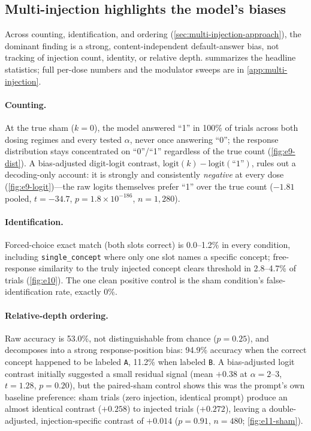 \subsection{Multi-injection highlights the model's biases}

\label{sec:multi-injection-results}

Across counting, identification, and ordering (\cref{sec:multi-injection-approach}), the dominant finding is a strong, content-independent default-answer bias, not tracking of injection count, identity, or relative depth.
 summarizes the headline statistics; full per-dose numbers and the modulator sweeps are in \cref{app:multi-injection}.

\paragraph{Counting.}
At the true sham ($k{=}0$), the model answered ``1'' in 100\% of trials across both dosing regimes and every tested $\alpha$, never once answering ``0''; the response distribution stays concentrated on ``0''/``1'' regardless of the true count (\cref{fig:e9-dist}).
A bias-adjusted digit-logit contrast, $\mathrm{logit}(k)-\mathrm{logit}(\text{``1''})$, rules out a decoding-only account: it is strongly and consistently \emph{negative} at every dose (\cref{fig:e9-logit})---the raw logits themselves prefer ``1'' over the true count ($-1.81$ pooled, $t=-34.7$, $p=1.8\times10^{-186}$, $n=1{,}280$).

\paragraph{Identification.}
Forced-choice exact match (both slots correct) is 0.0--1.2\% in every condition, including \texttt{single\_concept} where only one slot names a specific concept; free-response similarity to the truly injected concept clears threshold in 2.8--4.7\% of trials (\cref{fig:e10}).
The one clean positive control is the sham condition's false-identification rate, exactly 0\%.

\paragraph{Relative-depth ordering.}
Raw accuracy is 53.0\%, not distinguishable from chance ($p=0.25$), and decomposes into a strong response-position bias: 94.9\% accuracy when the correct concept happened to be labeled \texttt{A}, 11.2\% when labeled \texttt{B}.
A bias-adjusted logit contrast initially suggested a small residual signal (mean $+0.38$ at $\alpha{=}2\text{--}3$, $t=1.28$, $p=0.20$), but the paired-sham control shows this was the prompt's own baseline preference: sham trials (zero injection, identical prompt) produce an almost identical contrast ($+0.258$) to injected trials ($+0.272$), leaving a double-adjusted, injection-specific contrast of $+0.014$ ($p=0.91$, $n=480$; \cref{fig:e11-sham}).

